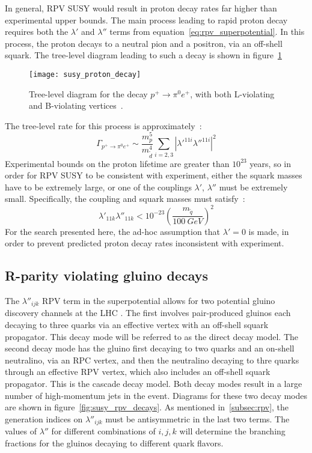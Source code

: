 In general, RPV SUSY would result in proton decay rates far higher than experimental upper bounds.
The main process leading to rapid proton decay requires both the $\lambda'$ and $\lambda''$ terms from equation~\ref{eq:rpv_superpotential}.
In this process, the proton decays to a neutral pion and a positron, via an off-shell squark.
The tree-level diagram leading to such a decay is shown in figure~\ref{fig:susy_proton_decay}
\begin{figure}[!ht]
    \centering
\texttt{[image: susy\_proton\_decay]}
\caption{Tree-level diagram for the decay $p^+ \rightarrow \pi^0 e^+$, with both L-violating and B-violating vertices~\cite{susy-primer-1998}.}
\label{fig:susy_proton_decay}
\end{figure}
The tree-level rate for this process is approximately~\cite{susy-primer-1998}:
\begin{equation}\label{eq:proton_decay_rate}
    \Gamma_{p^+ \rightarrow \pi^0 e^+} \sim \frac{m_p^5}{m_{\tilde{d}}^4} \sum_{i=2,3}\left|\lambda'^{11i}\lambda''^{11i}\right|^2
\end{equation}
Experimental bounds on the proton lifetime are greater than $10^{23}$ years,
so in order for RPV SUSY to be consistent with experiment,
either the squark masses have to be extremely large, or one of the couplings $\lambda'$, $\lambda''$ must be extremely small.
Specifically, the coupling and squark masses must satisfy~\cite{susy-rpv-constraints}:
\begin{equation}\label{eq:rpv_constraint}
    \lambda'_{11k} \lambda''_{11k} < 10^{-23} \left(\frac{m_{\tilde{q}}}{100~GeV}\right)^2
\end{equation}
For the search presented here, the ad-hoc assumption that $\lambda' = 0$ is made, in order to prevent predicted proton
decay rates inconsistent with experiment.

\subsection{R-parity violating gluino decays}\label{subsec:rpv_gluino}

The $\lambda''_{ijk}$ RPV term in the superpotential allows for two potential gluino discovery channels at the LHC .
The first involves pair-produced gluinos each decaying to three quarks via an effective vertex with an off-shell squark propagator.
This decay mode will be referred to as the direct decay model.
The second decay mode has the gluino first decaying to two quarks and an on-shell neutralino, via an RPC vertex, and then the neutralino decaying to thre quarks through an effective RPV vertex, which also includes an off-shell squark propagator.
This is the cascade decay model.
Both decay modes result in a large number of high-momentum jets in the event.
Diagrams for these two decay modes are shown in figure~\ref{fig:susy_rpv_decays}.
As mentioned in~\ref{subsec:rpv}, the generation indices on $\lambda''_{ijk}$ must be antisymmetric in the last two terms.
The values of $\lambda''$ for different combinations of $i,j,k$ will determine the branching fractions for the gluinos decaying to different quark flavors.

